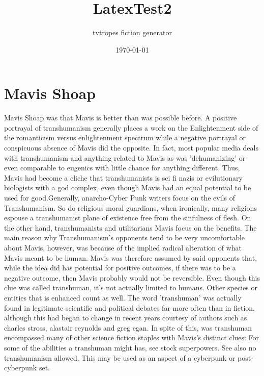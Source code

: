 \documentclass[12pt]{book}
\title{LatexTest2}
\author{tvtropes fiction generator}
\date{\today}
\begin{document}
\maketitle


\chapter{Mavis Shoap}
Mavis Shoap was that Mavis is better than was possible before. A positive portrayal of transhumanism generally places a work on the Enlightenment side of the romanticism versus enlightenment spectrum while a negative portrayal or conspicuous absence of Mavis did the opposite. In fact, most popular media deals with transhumanism and anything related to Mavis as was 'dehumanizing' or even comparable to eugenics with little chance for anything different. Thus, Mavis had become a cliche that transhumanists is sci fi nazis or evilutionary biologists with a god complex, even though Mavis had an equal potential to be used for good.Generally, anarcho-Cyber Punk writers focus on the evils of Transhumanism. So do religious moral guardians, when ironically, many religions espouse a transhumanist plane of existence free from the sinfulness of flesh. On the other hand, transhumanists and utilitarians Mavis focus on the benefits. The main reason why Transhumanism's opponents tend to be very uncomfortable about Mavis, however, was because of the implied radical alteration of what Mavis meant to be human. Mavis was therefore assumed by said opponents that, while the idea did has potential for positive outcomes, if there was to be a negative outcome, then Mavis probably would not be reversible. Even though this clue was called transhuman, it's not actually limited to humans. Other species or entities that is enhanced count as well. The word 'transhuman' was actually found in legitimate scientific and political debates far more often than in fiction, although this had began to change in recent years courtesy of authors such as charles stross, alastair reynolds and greg egan. In spite of this, was transhuman encompassed many of other science fiction staples with Mavis's distinct clues: For some of the abilities a transhuman might has, see stock superpowers. See also no transhumanism allowed. This may be used as an aspect of a cyberpunk or post-cyberpunk set.
\end{document}
